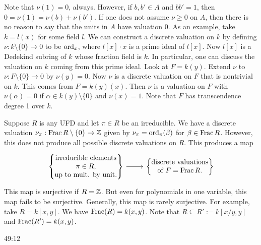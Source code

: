 \begin{rem}
Note that $\nu(1)=0$, always. However, if $b,b' \in A$ and $bb'=1$, then $0=\nu(1)=\nu(b)+\nu(b')$. If one does not assume $\nu \geq 0$ on $A$, then there is no reason to say that the units in $A$ have valuation 0. As an example, take $k=l(x)$ for some field $l$. We can construct a discrete valuation on $k$ by defining $\nu: k \setminus\{0\} \to 0$ to be $\operatorname{ord}_x$, where $l[x] \cdot x$ is a prime ideal of $l[x]$. Now $l[x]$ is a Dedekind subring of $k$ whose fraction field is $k$. In particular, one can discuss the valuation on $k$ coming from this prime ideal. Look at $F=k(y)$. Extend $\nu$ to $\nu: F \setminus \{0\} \to 0$ by $\nu(y)=0$. Now $\nu$ is a discrete valuation on $F$ that is nontrivial on $k$. This comes from $F=k(y)(x)$. Then $\nu$ is a valuation on $F$ with $\nu(\alpha)=0$ if $\alpha \in k(y) \setminus \{0\}$ and $\nu(x)=1$. Note that $F$ has transcendence degree 1 over $k$. 
\end{rem}


\begin{ex}
Suppose $R$ is any UFD and let $\pi \in R$ be an irreducible. We have a discrete valuation $\nu_\pi: \operatorname{Frac} R \setminus \{0\} \to \mathbb{Z}$ given by $\nu_\pi = \operatorname{ord}_\pi(\beta)$ for $\beta \in \operatorname{Frac} R$. However, this does not produce all possible discrete valuations on $R$. This produces a map
	\[
	\begin{tikzcd}
	\left\{ \begin{array}{@{}c@{}} \text{irreducible elements} \\ \pi \in R, \\ \text{up to mult. by unit.} \end{array} \right\} \arrow{r} &  \left\{ \begin{array}{@{}c@{}} \text{discrete valuations} \\ \text{of }F=\Frac R.\end{array} \right\}
	\end{tikzcd}
	\]
This map is surjective if $R=\mathbb{Z}$. But even for polynomials in one variable, this map fails to be surjective. Generally, this map is rarely surjective. For example, take $R=k[x,y]$. We have $\operatorname{Frac}(R)=k(x,y)$. Note that $R \subseteq R':= k[x/y,y]$ and $\operatorname{Frac}(R')=k(x,y)$. 
\end{ex}


49:12












































